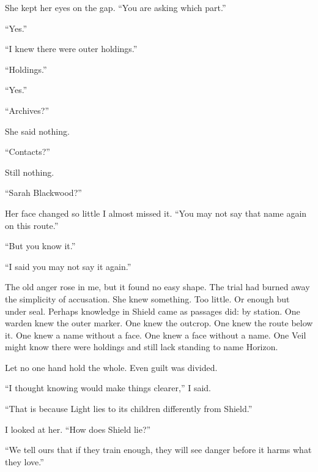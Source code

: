 She kept her eyes on the gap. ``You are asking which part.''\par

``Yes.''\par

``I knew there were outer holdings.''\par

``Holdings.''\par

``Yes.''\par

``Archives?''\par

She said nothing.\par

``Contacts?''\par

Still nothing.\par

``Sarah Blackwood?''\par

Her face changed so little I almost missed it. ``You may not say that name again on this route.''\par

``But you know it.''\par

``I said you may not say it again.''\par

The old anger rose in me, but it found no easy shape. The trial had burned away the simplicity of accusation. She knew something. Too little. Or enough but under seal. Perhaps knowledge in Shield came as passages did: by station. One warden knew the outer marker. One knew the outcrop. One knew the route below it. One knew a name without a face. One knew a face without a name. One Veil might know there were holdings and still lack standing to name Horizon.\par

Let no one hand hold the whole. Even guilt was divided.\par

``I thought knowing would make things clearer,'' I said.\par

``That is because Light lies to its children differently from Shield.''\par

I looked at her. ``How does Shield lie?''\par

``We tell ours that if they train enough, they will see danger before it harms what they love.''\par

